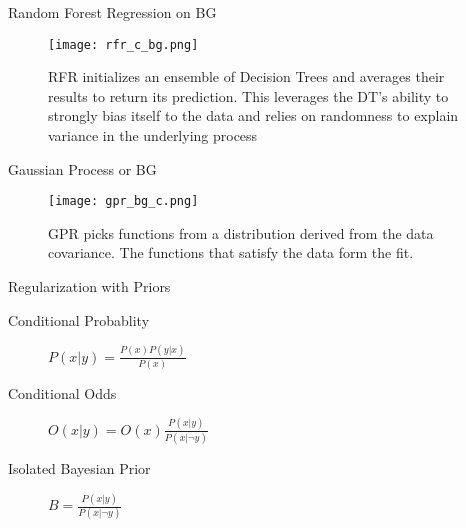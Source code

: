 \documentclass[10pt, compress]{beamer}
\begin{document}
\begin{frame}[allowframebreaks]{Random Forest Regression on BG}
\begin{figure}[htbp]
\centering
\texttt{[image: rfr\_c\_bg.png]}
\caption{RFR initializes an ensemble of Decision Trees and averages their results to return its prediction. This leverages the DT's ability to strongly bias itself to the data and relies on randomness to explain variance in the underlying process}
\end{figure}
\end{frame}
\begin{frame}[allowframebreaks]{Gaussian Process or BG}
\begin{figure}[htbp]
\centering
\texttt{[image: gpr\_bg\_c.png]}
\caption{GPR picks functions from a distribution derived from the data covariance. The functions that satisfy the data form the fit.}
\end{figure}
\begin{block}{Regularization with Priors}
\begin{description}
\item[{Conditional Probablity}] \(P(x|y) = \frac{P(x)P(y|x)}{P(x)}\)
\item[{Conditional Odds}] \(O(x|y) = O(x)\frac{P(x|y)}{P(x|\neg{}y)}\)
\item[{Isolated Bayesian Prior}] \(B = \frac{P(x|y)}{P(x|\neg{}y)}\)
\end{description}
\end{block}
\end{frame}

\section{}
\label{sec:orgd37d770}
\printbibliography
\end{document}

